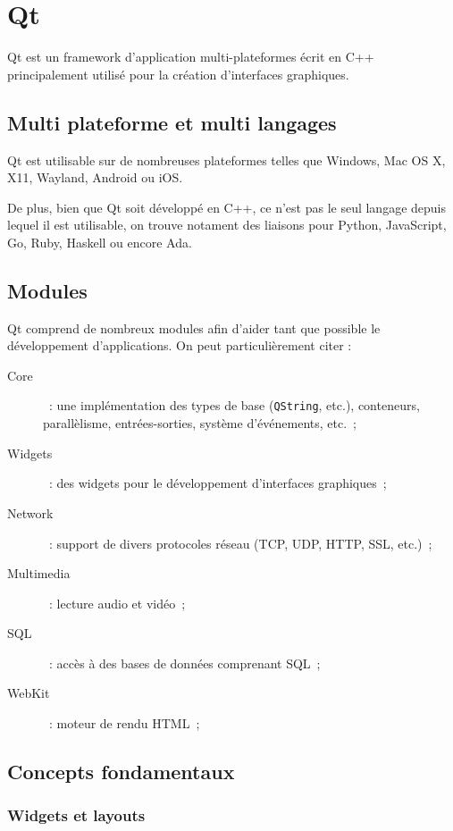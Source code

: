 \section{Qt}

Qt est un framework d'application multi-plateformes écrit en C++ principalement utilisé pour la création d'interfaces graphiques.

\subsection{Multi plateforme et multi langages}

Qt est utilisable sur de nombreuses plateformes telles que Windows, Mac OS X, X11, Wayland, Android ou iOS.

De plus, bien que Qt soit développé en C++, ce n'est pas le seul langage depuis lequel il est utilisable, on trouve notament des liaisons pour Python, JavaScript, Go, Ruby, Haskell ou encore Ada.

\subsection{Modules}

Qt comprend de nombreux modules afin d'aider tant que possible le développement d'applications.
On peut particulièrement citer :
\begin{description}
	\item[Core]~: une implémentation des types de base (\verb|QString|, etc.), conteneurs, parallèlisme, entrées-sorties, système d'événements, etc.~;
	\item[Widgets]~: des widgets pour le développement d'interfaces graphiques~;
	\item[Network]~: support de divers protocoles réseau (TCP, UDP, HTTP, SSL, etc.)~;
	\item[Multimedia]~: lecture audio et vidéo~;
	\item[SQL]~: accès à des bases de données comprenant SQL~;
	\item[WebKit]~: moteur de rendu HTML~;
\end{description}

\subsection{Concepts fondamentaux}

\subsubsection{Widgets et layouts}

